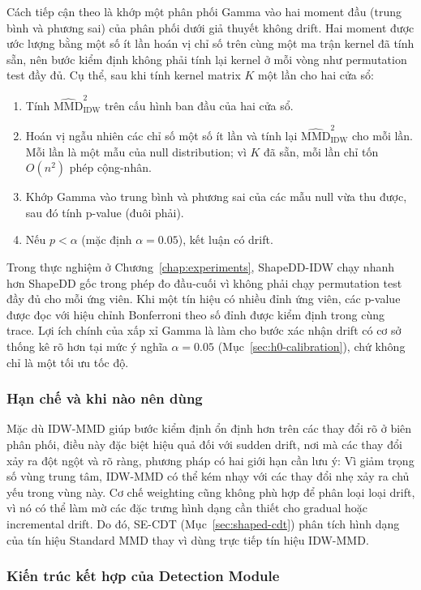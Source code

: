 Cách tiếp cận theo \cite{gretton2009gamma} là khớp một phân phối Gamma vào hai moment đầu (trung bình và phương sai) của phân phối dưới giả thuyết không drift. Hai moment được ước lượng bằng một số ít lần hoán vị chỉ số trên cùng một ma trận kernel đã tính sẵn, nên bước kiểm định không phải tính lại kernel ở mỗi vòng như permutation test đầy đủ. Cụ thể, sau khi tính kernel matrix $K$ một lần cho hai cửa sổ:
\begin{enumerate}
	\item Tính $\widehat{\text{MMD}}^2_{\text{IDW}}$ trên cấu hình ban đầu của hai cửa sổ.
	\item Hoán vị ngẫu nhiên các chỉ số một số ít lần và tính lại $\widehat{\text{MMD}}^2_{\text{IDW}}$ cho mỗi lần. Mỗi lần là một mẫu của null distribution; vì $K$ đã sẵn, mỗi lần chỉ tốn $O(n^2)$ phép cộng-nhân.
	\item Khớp Gamma vào trung bình và phương sai của các mẫu null vừa thu được, sau đó tính p-value (đuôi phải).
	\item Nếu $p < \alpha$ (mặc định $\alpha = 0.05$), kết luận có drift.
\end{enumerate}

Trong thực nghiệm ở Chương~\ref{chap:experiments}, ShapeDD-IDW chạy nhanh hơn ShapeDD gốc trong phép đo đầu-cuối vì không phải chạy permutation test đầy đủ cho mỗi ứng viên. Khi một tín hiệu có nhiều đỉnh ứng viên, các p-value được đọc với hiệu chỉnh Bonferroni theo số đỉnh được kiểm định trong cùng trace. Lợi ích chính của xấp xỉ Gamma là làm cho bước xác nhận drift có cơ sở thống kê rõ hơn tại mức ý nghĩa $\alpha = 0.05$ (Mục~\ref{sec:h0-calibration}), chứ không chỉ là một tối ưu tốc độ.

\subsubsection{Hạn chế và khi nào nên dùng}
Mặc dù IDW-MMD giúp bước kiểm định ổn định hơn trên các thay đổi rõ ở biên phân phối, điều này đặc biệt hiệu quả đối với sudden drift, nơi mà các thay đổi xảy ra đột ngột và rõ ràng, phương pháp có hai giới hạn cần lưu ý:
Vì giảm trọng số vùng trung tâm, IDW-MMD có thể kém nhạy với các thay đổi nhẹ xảy ra chủ yếu trong vùng này. Cơ chế weighting cũng không phù hợp để phân loại loại drift, vì nó có thể làm mờ các đặc trưng hình dạng cần thiết cho gradual hoặc incremental drift. Do đó, SE-CDT (Mục~\ref{sec:shaped-cdt}) phân tích hình dạng của tín hiệu Standard MMD thay vì dùng trực tiếp tín hiệu IDW-MMD.

\subsubsection{Kiến trúc kết hợp của Detection Module}
\label{sec:detection-hybrid}

